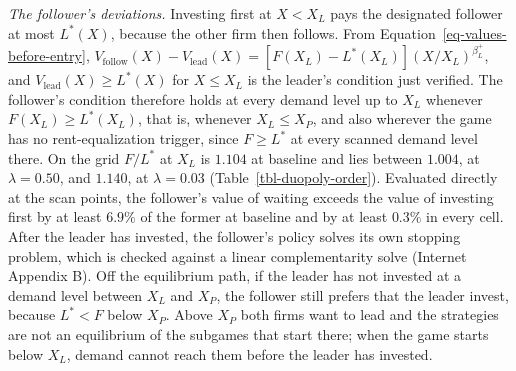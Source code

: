 \documentclass[
  11pt,
  letterpaper,
]{scrartcl}
\begin{document}
\emph{The follower's deviations.} Investing first at \(X < X_L\) pays
the designated follower at most \(L^*(X)\), because the other firm then
follows. From Equation~\ref{eq-values-before-entry},
\(V_{\text{follow}}(X) - V_{\text{lead}}(X) = [F(X_L) - L^*(X_L)](X/X_L)^{\beta_L^+}\),
and \(V_{\text{lead}}(X) \geq L^*(X)\) for \(X \leq X_L\) is the
leader's condition just verified. The follower's condition therefore
holds at every demand level up to \(X_L\) whenever
\(F(X_L) \geq L^*(X_L)\), that is, whenever \(X_L \leq X_P\), and also
wherever the game has no rent-equalization trigger, since \(F \geq L^*\)
at every scanned demand level there. On the grid \(F/L^*\) at \(X_L\) is
\(1.104\) at baseline and lies between \(1.004\), at \(\lambda = 0.50\),
and \(1.140\), at \(\lambda = 0.03\) (Table~\ref{tbl-duopoly-order}).
Evaluated directly at the scan points, the follower's value of waiting
exceeds the value of investing first by at least \(6.9\%\) of the former
at baseline and by at least \(0.3\%\) in every cell. After the leader
has invested, the follower's policy solves its own stopping problem,
which is checked against a linear complementarity solve (Internet
Appendix B). Off the equilibrium path, if the leader has not invested at
a demand level between \(X_L\) and \(X_P\), the follower still prefers
that the leader invest, because \(L^* < F\) below \(X_P\). Above \(X_P\)
both firms want to lead and the strategies are not an equilibrium of the
subgames that start there; when the game starts below \(X_L\), demand
cannot reach them before the leader has invested.
\end{document}
